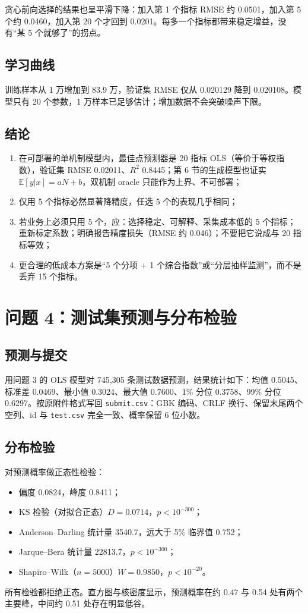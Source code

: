 \documentclass{article}
\begin{document}
贪心前向选择的结果也呈平滑下降：加入第 1 个指标 RMSE 约 0.0501，加入第 5 个约 0.0460，加入第 20 个才回到 0.0201。每多一个指标都带来稳定增益，没有“某 5 个就够了”的拐点。

\subsection{学习曲线}
训练样本从 1 万增加到 83.9 万，验证集 RMSE 仅从 0.020129 降到 0.020108。模型只有 20 个参数，1 万样本已足够估计；增加数据不会突破噪声下限。



\subsection{结论}
\begin{enumerate}
  \item 在可部署的单机制模型内，最佳点预测器是 20 指标 OLS（等价于等权指数），验证集 RMSE 0.02011、$R^2$ 0.8445；第 6 节的生成模型也证实 $\mathbb{E}[y|x]=aN+b$，双机制 oracle 只能作为上界、不可部署；
  \item 仅用 5 个指标必然显著降精度，任选 5 个的表现几乎相同；
  \item 若业务上必须只用 5 个，应：选择稳定、可解释、采集成本低的 5 个指标；重新标定系数；明确报告精度损失（RMSE 约 0.046）；不要把它说成与 20 指标等效；
  \item 更合理的低成本方案是“5 个分项 + 1 个综合指数”或“分层抽样监测”，而不是丢弃 15 个指标。
\end{enumerate}

\section{问题 4：测试集预测与分布检验}

\subsection{预测与提交}
用问题 3 的 OLS 模型对 745,305 条测试数据预测，结果统计如下：均值 0.5045、标准差 0.0469、最小值 0.3024、最大值 0.7600、1\% 分位 0.3758、99\% 分位 0.6297。按原附件格式写回 \texttt{submit.csv}：GBK 编码、CRLF 换行、保留末尾两个空列、id 与 \texttt{test.csv} 完全一致、概率保留 6 位小数。

\subsection{分布检验}
对预测概率做正态性检验：
\begin{itemize}
  \item 偏度 0.0824，峰度 0.8411；
  \item KS 检验（对拟合正态）$D=0.0714$，$p<10^{-300}$；
  \item Anderson--Darling 统计量 3540.7，远大于 5\% 临界值 0.752；
  \item Jarque--Bera 统计量 22813.7，$p<10^{-300}$；
  \item Shapiro--Wilk（$n=5000$）$W=0.9850$，$p<10^{-20}$。
\end{itemize}
所有检验都拒绝正态。直方图与核密度显示，预测概率在约 0.47 与 0.54 处有两个主要峰，中间约 0.51 处存在明显低谷。
\end{document}
